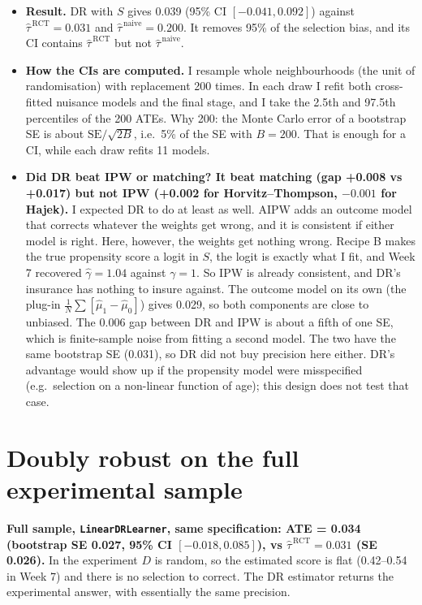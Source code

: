 \documentclass[11pt]{article}
\newcommand{\taurct}{\hat\tau^{\,\mathrm{RCT}}}
\newcommand{\taunaive}{\hat\tau^{\,\mathrm{naive}}}
\begin{document}
\begin{itemize}
\item \textbf{Result.} DR with $S$ gives 0.039 (95\% CI $[-0.041, 0.092]$) against $\taurct=0.031$ and $\taunaive=0.200$. It removes 95\% of the selection bias, and its CI contains $\taurct$ but not $\taunaive$.
\item \textbf{How the CIs are computed.} I resample whole neighbourhoods (the unit of randomisation) with replacement 200 times. In each draw I refit both cross-fitted nuisance models and the final stage, and I take the 2.5th and 97.5th percentiles of the 200 ATEs. Why 200: the Monte Carlo error of a bootstrap SE is about $\mathrm{SE}/\sqrt{2B}$, i.e.\ 5\% of the SE with $B=200$. That is enough for a CI, while each draw refits 11 models.
\item \textbf{Did DR beat IPW or matching? It beat matching (gap +0.008 vs +0.017) but not IPW (+0.002 for Horvitz--Thompson, $-0.001$ for Hajek).} I expected DR to do at least as well. AIPW adds an outcome model that corrects whatever the weights get wrong, and it is consistent if either model is right. Here, however, the weights get nothing wrong. Recipe B makes the true propensity score a logit in $S$, the logit is exactly what I fit, and Week 7 recovered $\hat\gamma=1.04$ against $\gamma=1$. So IPW is already consistent, and DR's insurance has nothing to insure against. The outcome model on its own (the plug-in $\frac1N\sum[\hat\mu_1-\hat\mu_0]$) gives 0.029, so both components are close to unbiased. The 0.006 gap between DR and IPW is about a fifth of one SE, which is finite-sample noise from fitting a second model. The two have the same bootstrap SE (0.031), so DR did not buy precision here either. DR's advantage would show up if the propensity model were misspecified (e.g.\ selection on a non-linear function of age); this design does not test that case.
\end{itemize}

\section{Doubly robust on the full experimental sample}
\textbf{Full sample, \texttt{LinearDRLearner}, same specification: ATE = 0.034 (bootstrap SE 0.027, 95\% CI $[-0.018, 0.085]$), vs $\taurct=0.031$ (SE 0.026).} In the experiment $D$ is random, so the estimated score is flat (0.42--0.54 in Week 7) and there is no selection to correct. The DR estimator returns the experimental answer, with essentially the same precision.
\end{document}
